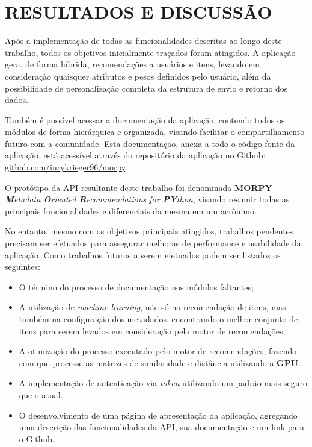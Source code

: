 \chapter{RESULTADOS E DISCUSSÃO}

Após a implementação de todas as funcionalidades descritas ao longo deste trabalho, todos os objetivos inicialmente traçados foram atingidos. A aplicação gera, de forma híbrida, recomendações a usuários e itens, levando em consideração quaisquer atributos e pesos definidos pelo usuário, além da possibilidade de personalização completa da estrutura de envio e retorno dos dados.

Também é possível acessar a documentação da aplicação, contendo todos os módulos de forma hierárquica e organizada, visando facilitar o compartilhamento futuro com a comunidade. Esta documentação, anexa a todo o código fonte da aplicação, está acessível através do repositório da aplicação no Github: \url{github.com/iurykrieger96/morpy}.

O protótipo da API resultante deste trabalho foi denominada \textbf{MORPY} - \textit{\textbf{M}etadata \textbf{O}riented \textbf{R}ecommendations for \textbf{PY}thon}, visando resumir todas as principais funcionalidades e diferenciais da mesma em um acrônimo.

No entanto, mesmo com os objetivos principais atingidos, trabalhos pendentes precisam ser efetuados para assegurar melhoras de performance e usabilidade da aplicação. Como trabalhos futuros a serem efetuados podem ser listados os seguintes:

\begin{itemize}
	\item O término do processo de documentação nos módulos faltantes;

	\item A utilização de \textit{machine learning}, não só na recomendação de itens, mas também na configuração dos metadados, encontrando o melhor conjunto de itens para serem levados em consideração pelo motor de recomendações;

	\item A otimização do processo executado pelo motor de recomendações, fazendo com que processe as matrizes de similaridade e distância utilizando a \textbf{GPU}.

	\item A implementação de autenticação via \textit{token} utilizando um padrão mais seguro que o atual.

	\item O desenvolvimento de uma página de apresentação da aplicação, agregando uma descrição das funcionalidades da API, sua documentação e um link para o Github.
\end{itemize}